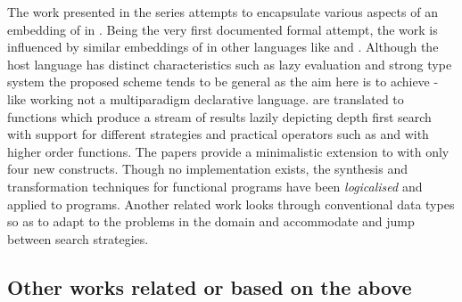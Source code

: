 \documentclass[thesis-solanki.tex]{subfiles}
\begin{document}
The work presented in the series
\cite{spivey1999embedding,seres1999algebra,seres2001higher,spivey1999algebra,seres2001algebra} attempts to
encapsulate various aspects of an embedding of  in .
Being the very first documented formal attempt, the work is influenced by similar embeddings of 
in other languages like  and .
Although the host language has distinct characteristics such as lazy evaluation and strong type system the proposed
scheme tends to be general as the aim here is to achieve
-like working not a multiparadigm
declarative language.
  are translated to  functions which produce a stream of results
lazily depicting depth first search with support for different strategies and practical operators such as
 and  with higher order functions.
The papers provide a minimalistic extension to  with only four new constructs.
Though no implementation exists, the synthesis and transformation techniques for functional programs have been
\textit{logicalised} and applied to  programs.
Another related work \cite{spivey2000functional} looks through conventional data types so as to adapt to the
problems in the domain and accommodate and jump between search strategies.


\subsection{Other works related or based on the above}

\end{document}

